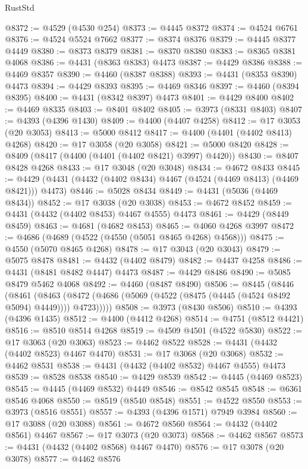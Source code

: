 \begin{lexlean}{RustStd}
\begin{coremodule}
@8372 := @4529 (@4530 @254)
@8373 := @4445 @8372
@8374 := @4524 @6761
@8376 := @4524 @5524 @7662
@8377 := @8374 @8376
@8379 := @4445 @8377 @4449
@8380 := @8373 @8379
@8381 := @8370 @8380
@8383 := @8365 @8381 @4068
@8386 := @4431 (@8363 @8383) @4473
@8387 := @4429 @8386
@8388 := @4469 @8357
@8390 := @4460 (@8387 @8388)
@8393 := @4431 (@8353 @8390) @4473
@8394 := @4429 @8393
@8395 := @4469 @8346
@8397 := @4460 (@8394 @8395)
@8400 := @4431 (@8342 @8397) @4473
@8401 := @4429 @8400
@8402 := @4469 @8335
@8403 := @8401 @8402
@8405 := @3973 (@8331 @8403)
@8407 := @4393 (@4396 @1430)
@8409 := @4400 (@4407 @4258)
@8412 := @17 @3053 (@20 @3053)
@8413 := @5000 @8412
@8417 := @4400 (@4401 (@4402 @8413) @4268)
@8420 := @17 @3058 (@20 @3058)
@8421 := @5000 @8420
@8428 := @8409 (@8417 (@4400 (@4401 (@4402 @8421) @3997) @4420))
@8430 := @8407 @8428 @4268
@8433 := @17 @3048 (@20 @3048)
@8434 := @4672 @8433
@8445 := @4429 (@4431 (@4432 (@4402 @8434) @4467 (@4524 (@4469 @8413) (@4469 @8421))) @4473)
@8446 := @5028 @8434
@8449 := @4431 (@5036 (@4469 @8434))
@8452 := @17 @3038 (@20 @3038)
@8453 := @4672 @8452
@8459 := @4431 (@4432 (@4402 @8453) @4467 @4555) @4473
@8461 := @4429 (@8449 @8459)
@8463 := @4681 (@4682 @8453)
@8465 := @4060 @4268 @3997
@8472 := @4686 (@4689 (@4522 (@4550 (@5051 @8465 @4268) @4568)))
@8475 := @4550 (@5070 @8465 @4268)
@8478 := @17 @3043 (@20 @3043)
@8479 := @5075 @8478
@8481 := @4432 (@4402 @8479)
@8482 := @4437 @4258
@8486 := @4431 (@8481 @8482 @4447) @4473
@8487 := @4429 @8486
@8490 := @5085 @8479 @5462 @4068
@8492 := @4460 (@8487 @8490)
@8506 := @8445
    (@8446
      (@8461
        (@8463 (@8472 (@4686 (@5069 (@4522 (@8475 (@4445 (@4524 @8492 @5094) @4449)))) @4723)))))
@8508 := @3973 (@8430 @8506)
@8510 := @4393 (@4396 @1435)
@8512 := @4400 (@4412 @4268)
@8514 := @4751 (@8512 @4421)
@8516 := @8510 @8514 @4268
@8519 := @4509 @4501 (@4522 @5830)
@8522 := @17 @3063 (@20 @3063)
@8523 := @4462 @8522
@8528 := @4431 (@4432 (@4402 @8523) @4467 @4470)
@8531 := @17 @3068 (@20 @3068)
@8532 := @4462 @8531
@8538 := @4431 (@4432 (@4402 @8532) @4467 @4555) @4473
@8539 := @8528 @8538
@8540 := @4429 @8539
@8542 := @4445 (@4469 @8523)
@8545 := @4445 (@4469 @8532) @4449
@8546 := @8542 @8545
@8548 := @6361 @8546 @4068
@8550 := @8519 (@8540 @8548)
@8551 := @4522 @8550
@8553 := @3973 (@8516 @8551)
@8557 := @4393 (@4396 @1571) @7949 @3984
@8560 := @17 @3088 (@20 @3088)
@8561 := @4672 @8560
@8564 := @4432 (@4402 @8561) @4467
@8567 := @17 @3073 (@20 @3073)
@8568 := @4462 @8567
@8573 := @4431 (@4432 (@4402 @8568) @4467 @4470)
@8576 := @17 @3078 (@20 @3078)
@8577 := @4462 @8576

\end{coremodule}
\end{lexlean}
